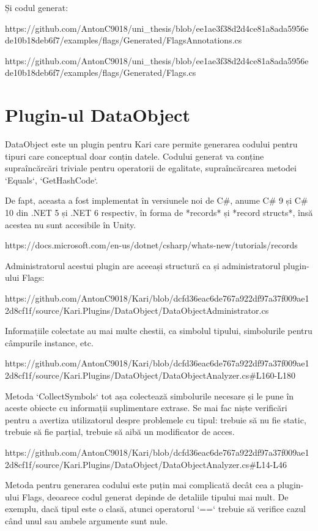 \documentclass{report}
\begin{document}
Și codul generat:

https://github.com/AntonC9018/uni_thesis/blob/ee1ae3f38d2d4ce81a8ada5956ede10b18deb6f7/examples/flags/Generated/FlagsAnnotations.cs

https://github.com/AntonC9018/uni_thesis/blob/ee1ae3f38d2d4ce81a8ada5956ede10b18deb6f7/examples/flags/Generated/Flags.cs

\section{Plugin-ul DataObject}

DataObject este un plugin pentru Kari care permite generarea codului pentru tipuri care conceptual doar conțin datele.
Codului generat va conține supraîncărcări triviale pentru operatorii de egalitate, supraîncărcarea metodei `Equals`, `GetHashCode`.

De fapt, aceasta a fost implementat în versiunele noi de C#, anume C# 9 și C# 10 din .NET 5 și .NET 6 respectiv, în forma de *records* și *record structs*, însă acestea nu sunt accesibile în Unity.

https://docs.microsoft.com/en-us/dotnet/csharp/whats-new/tutorials/records

Administratorul acestui plugin are aceeași structură ca și administratorul plugin-ului Flags:

https://github.com/AntonC9018/Kari/blob/dcfd36eac6de767a922df97a37f009ae12d8cf1f/source/Kari.Plugins/DataObject/DataObjectAdministrator.cs

Informațiile colectate au mai multe chestii, ca simbolul tipului, simbolurile pentru câmpurile instance, etc.

https://github.com/AntonC9018/Kari/blob/dcfd36eac6de767a922df97a37f009ae12d8cf1f/source/Kari.Plugins/DataObject/DataObjectAnalyzer.cs#L160-L180

Metoda `CollectSymbols` tot așa colectează simbolurile necesare și le pune în aceste obiecte cu informații suplimentare extrase.
Se mai fac niște verificări pentru a avertiza utilizatorul despre problemele cu tipul: trebuie să nu fie static, trebuie să fie parțial, trebuie să aibă un modificator de acces.

https://github.com/AntonC9018/Kari/blob/dcfd36eac6de767a922df97a37f009ae12d8cf1f/source/Kari.Plugins/DataObject/DataObjectAnalyzer.cs#L14-L46

Metoda pentru generarea codului este puțin mai complicată decât cea a plugin-ului Flags, deoarece codul generat depinde de detaliile tipului mai mult.
De exemplu, dacă tipul este o clasă, atunci operatorul `==` trebuie să verifice cazul când unul sau ambele argumente sunt nule. 
\end{document}
